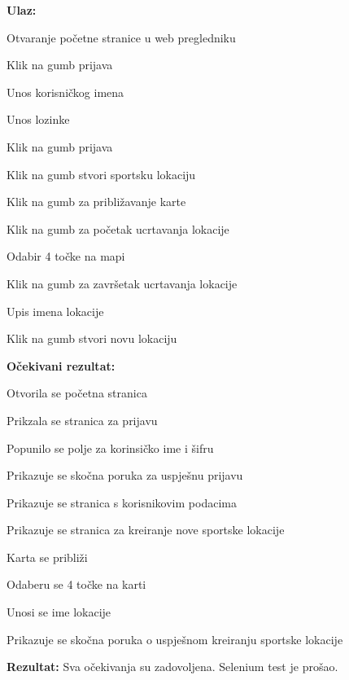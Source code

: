 		
		\hfill\break
		\noindent\textbf{Ulaz:}
		
		\begin{packed_enum}
			
				\item Otvaranje početne stranice u web pregledniku
			 	\item Klik na gumb prijava
			 	\item Unos korisničkog imena
			 	\item Unos lozinke
			 	\item Klik na gumb prijava
			 	\item Klik na gumb stvori sportsku lokaciju
			 	\item Klik na gumb za približavanje karte
			 	\item Klik na gumb za početak ucrtavanja lokacije
			 	\item Odabir 4 točke na mapi
			 	\item Klik na gumb za završetak ucrtavanja lokacije
			 	\item Upis imena lokacije
			 	\item Klik na gumb stvori novu lokaciju
			
		\end{packed_enum}
		
		\noindent\textbf{Očekivani rezultat:}
		
		\begin{packed_enum}
			
				\item Otvorila se početna stranica
			 	\item Prikzala se stranica za prijavu
			 	\item Popunilo se polje za korinsičko ime i šifru
			 	\item Prikazuje se skočna poruka za uspješnu prijavu
			 	\item Prikazuje se stranica s korisnikovim podacima
			 	\item Prikazuje se stranica za kreiranje nove sportske lokacije
			 	\item Karta se približi
			 	\item Odaberu se 4 točke na karti
			 	\item Unosi se ime lokacije
			 	\item Prikazuje se skočna poruka o uspješnom kreiranju sportske lokacije
			
		\end{packed_enum}
		
		\noindent\textbf{Rezultat:} Sva očekivanja su zadovoljena. Selenium test je prošao.
		
